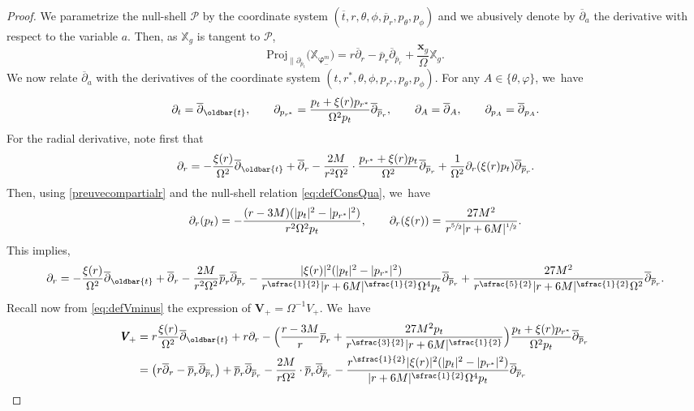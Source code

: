 \documentclass[JEP,XML,SOM,Unicode,published]{cedram}
\let\bar\oldbar
\theoremstyle{plain}
\theoremstyle{definition}
\newcommand\T{{\mathbb{X}}}
\begin{document}
\begin{proof}
We parametrize the null-shell $\mathcal{P}$ by the coordinate system $\!(\overline{t},r,\theta,\phi, \overline{p}_r, p_\theta, p_\phi)$ and we abusively denote by $\overline{\partial}_a$ the derivative with respect to the variable $a$. Then, as $\T_g$ is tangent to $\mathcal{P}$,
\[
\mathrm{Proj}_{\parallel \partial_{\overline{p}_t}} \bigl(\T_{\pmb{\varphi}_-^m} \bigr) = r \overline{\partial}_r-\overline{p}_r \overline{\partial}_{\overline{p}_r}+\frac{\pmb{x}_g}{\Omega} \T_g.
\]
We now relate $\overline{\partial}_a$ with the derivatives of the coordinate system $(t,r^*,\theta, \phi,p_{r^*},p_\theta, p_\phi)$. For any $A \in \{ \theta, \varphi \}$, we~have
\[
\partial_{t}= \overline{\partial}_{\bar{t}}, \qquad \partial_{p_{r^*}}= \frac{p_t+\xi(r)p_{r^*}}{\Omega^2 p_t} \overline{\partial}_{\overline{p}_r}, \qquad \partial_A = \overline{\partial}_A, \qquad \partial_{p_A}=\overline{\partial}_{p_A}.
\]
For the radial derivative, note first that
\[
\partial_r = -\frac{\xi(r)}{ \Omega^2} \overline{\partial}_{\bar{t}}+\overline{\partial}_r-\frac{2M}{r^2\Omega^2} \cdot \frac{p_{r^*}+\xi(r)p_t}{\Omega^2} \overline{\partial}_{\overline{p}_r}+\frac{1}{\Omega^2} \partial_r (\xi(r)p_t)\overline{\partial}_{\overline{p}_r}.
\]
Then, using \eqref{preuvecompartialr} and the null-shell relation \eqref{eq:defConsQua}, we~have
\[
\partial_r (p_t) = - \frac{(r-3M)(|p_t|^2-|p_{r^*}|^2)}{r^2 \Omega^2 p_t},\qquad \partial_r (\xi(r)) = \frac{27M^2}{r^{\sfrac{5}{2}} |r+6M|^{\sfrac{1}{2}} }.
\]
This implies,
\[
\partial_r = -\frac{\xi(r)}{ \Omega^2} \overline{\partial}_{\bar{t}}+\overline{\partial}_r-\frac{2M}{r^2\Omega^2} \overline{p}_r \overline{\partial}_{\overline{p}_r}-\frac{|\xi (r)|^2(|p_t|^2-|p_{r^*}|^2)}{r^{\sfrac{1}{2}}|r+6M|^{\sfrac{1}{2}}\Omega^4p_t} \overline{\partial}_{\overline{p}_r} +\frac{27M^2}{r^{\sfrac{5}{2}} |r+6M|^{\sfrac{1}{2}} \Omega^2} \overline{\partial}_{\overline{p}_r}.
\]
Recall now from \eqref{eq:defVminus} the expression of $\pmb{V}_{\! +}=\Omega^{-1}V_+$. We~have
\begin{align*}
\pmb{V}_{\! +} & = r\frac{\xi(r)}{ \Omega^2} \overline{\partial}_{\bar{t}}+r\partial_r - \Bigl(\frac{r-3M}{r} \overline{p}_r +\frac{27M^2 p_t}{r^{\sfrac{3}{2}}|r+6M|^{\sfrac{1}{2}}} \Bigr) \frac{p_t+\xi(r)p_{r^*}}{ \Omega^2p_t}\overline{\partial}_{\overline{p}_r} \\
& = \bigl(r \overline{\partial}_r-\overline{p}_r \overline{\partial}_{\overline{p}_r} \bigr)+\overline{p}_r \overline{\partial}_{\overline{p}_r} -\frac{2M}{r\Omega^2} \cdot \overline{p}_r \overline{\partial}_{\overline{p}_r}-\frac{r^{\sfrac{1}{2}}|\xi(r)|^2(|p_t|^2-|p_{r^*}|^2)}{|r+6M|^{\sfrac{1}{2}}\Omega^4p_t} \overline{\partial}_{\overline{p}_r} \\

\end{align*}
\end{proof}
\end{document}
